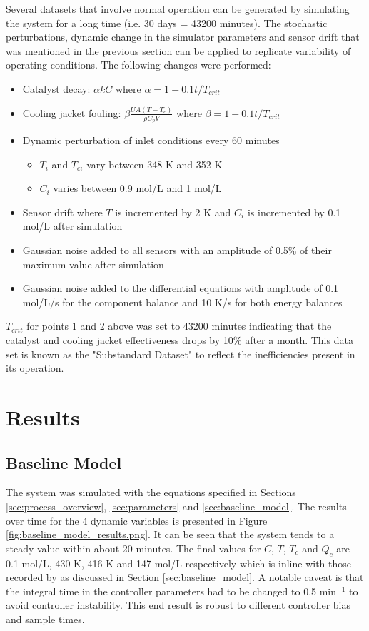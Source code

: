 \documentclass{article}
\begin{document}
Several datasets that involve normal operation can be generated by simulating the system for a long time (i.e. 30 days = 43200 minutes). The stochastic perturbations, dynamic change in the simulator parameters and sensor drift that was mentioned in the previous section can be applied to replicate variability of operating conditions. The following changes were performed:

\begin{itemize}
	\item Catalyst decay: $\alpha kC$ where $\alpha=1-0.1 t/T_{crit}$  
	\item Cooling jacket fouling: $\beta \frac{UA(T-T_c)}{\rho C_p V}$ where $\beta=1-0.1 t/T_{crit}$
	\item Dynamic perturbation of inlet conditions every 60 minutes 
	\begin{itemize}
		\item $T_i$ and $T_{ci}$ vary between 348 K and 352 K
		\item $C_i$ varies between 0.9 mol/L and 1 mol/L
	\end{itemize}
	\item Sensor drift where $T$ is incremented by 2 K and $C_i$ is incremented by 0.1 mol/L after simulation
	\item Gaussian noise added to all sensors with an amplitude of 0.5\% of their maximum value after simulation
	\item Gaussian noise added to the differential equations with amplitude of 0.1 mol/L/s for the component balance and 10 K/s for both energy balances
\end{itemize}

$T_{crit}$ for points 1 and 2 above was set to 43200 minutes indicating that the catalyst and cooling jacket effectiveness drops by 10\% after a month. This data set is known as the "Substandard Dataset" to reflect the inefficiencies present in its operation.


\section{Results}

\subsection{Baseline Model}

The system was simulated with the equations specified in Sections \ref{sec:process_overview}, \ref{sec:parameters} and \ref{sec:baseline_model}. The results over time for the 4 dynamic variables is presented in Figure \ref{fig:baseline_model_results.png}. It can be seen that the system tends to a steady value within about 20 minutes. The final values for $C$, $T$, $T_c$ and $Q_c$ are 0.1 mol/L, 430 K, 416 K and 147 mol/L respectively which is inline with those recorded by \cite{pilario2018canonical} as discussed in Section \ref{sec:baseline_model}. A notable caveat is that the integral time in the controller parameters had to be changed to 0.5 min$^{-1}$ to avoid controller instability. This end result is robust to different controller bias and sample times.
\end{document}
